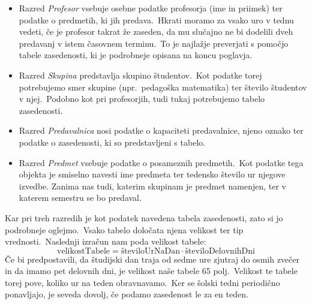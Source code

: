 \documentclass[a4paper,10pt]{article}
\begin{document}
\begin{itemize}
   \item Razred \emph{Profesor} vsebuje osebne podatke profesorja (ime in priimek) ter
   podatke o predmetih, ki jih predava.\ Hkrati moramo za vsako uro v tednu vedeti, če
   je profesor takrat že zaseden, da mu slučajno ne bi dodelili dveh predavanj v istem
   časovnem terminu.\ To je najlažje preverjati s pomočjo tabele zasedenosti, ki je
   podrobneje opisana na koncu poglavja.

  \item Razred \emph{Skupina} predstavlja skupino študentov.\ Kot podatke torej potrebujemo
   smer skupine (npr.\ pedagoška matematika) ter število študentov v njej.\ Podobno kot pri
   profesorjih, tudi tukaj potrebujemo tabelo zasedenosti.

   \item Razred \emph{Predavalnica} nosi podatke o kapaciteti predavalnice, njeno oznako
   ter podatke o zasedenosti, ki so predstavljeni s tabelo.

  \item Razred \emph{Predmet} vsebuje podatke o posameznih predmetih.\ Kot podatke tega
   objekta je smiselno navesti ime predmeta ter tedensko število ur njegove izvedbe.
   Zanima nas tudi, katerim skupinam je predmet namenjen, ter v katerem semestru se bo
   predaval.
\end{itemize}
\noindent Kar pri treh razredih je kot podatek navedena tabela zasedenosti, zato si jo podrobneje
oglejmo.\ Vsako tabelo določata njena velikost ter tip vrednosti.\ Naslednji izračun nam
poda velikost tabele:
\[
  \text{velikostTabele}
  = \text{številoUrNaDan} \cdot \text{številoDelovnihDni}
\]
Če bi predpostavili, da študijski dan traja od sedme ure zjutraj do osmih zvečer in da
imamo pet delovnih dni, je velikost naše tabele 65 polj.\ Velikost te tabele torej pove,
koliko ur na teden obravnavamo.\ Ker se šolski tedni periodično ponavljajo, je seveda
dovolj, če podamo zasedenost le za en teden.
\end{document}
